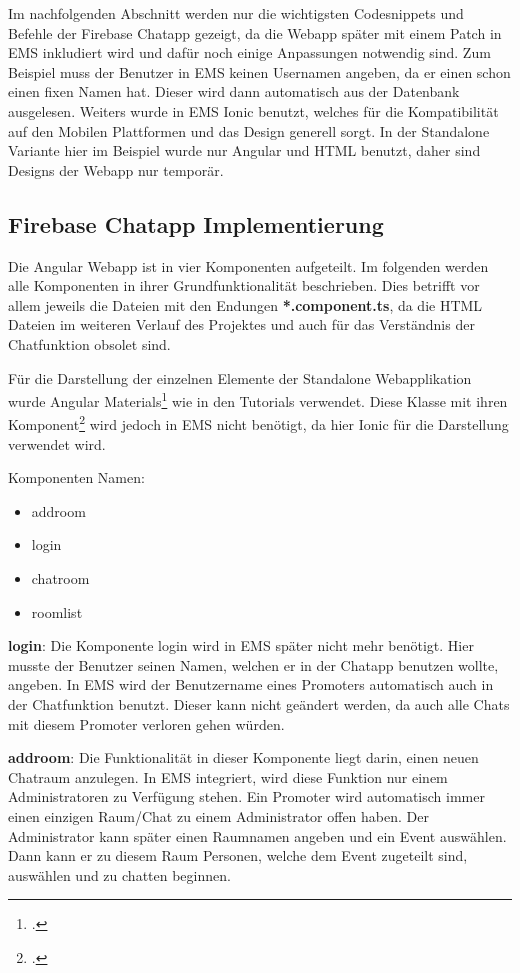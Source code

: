 Im nachfolgenden Abschnitt werden nur die wichtigsten Codesnippets und Befehle der Firebase Chatapp gezeigt, da die Webapp später mit einem Patch in EMS inkludiert wird und dafür noch einige Anpassungen notwendig sind.
Zum Beispiel muss der Benutzer in EMS keinen Usernamen angeben, da er einen schon einen fixen Namen hat. Dieser wird dann automatisch aus der Datenbank ausgelesen. Weiters wurde in EMS Ionic benutzt, welches für die 
Kompatibilität auf den Mobilen Plattformen und das Design generell sorgt. In der Standalone Variante hier im Beispiel wurde nur Angular und HTML benutzt, daher sind Designs der Webapp nur temporär.
\subsection{Firebase Chatapp Implementierung}
Die Angular Webapp ist in vier Komponenten aufgeteilt. Im folgenden werden alle Komponenten in ihrer Grundfunktionalität beschrieben. Dies betrifft vor allem jeweils die Dateien mit den Endungen \textbf{*.component.ts}, da die 
HTML Dateien im weiteren Verlauf des Projektes und auch für das Verständnis der Chatfunktion obsolet sind.

Für die Darstellung der einzelnen Elemente der Standalone Webapplikation wurde Angular Materials\footcite{materials} wie in den Tutorials verwendet.
Diese Klasse mit ihren Komponent\footcite{matierials-componenten} wird jedoch in EMS nicht benötigt, da hier Ionic für die Darstellung verwendet wird.

Komponenten Namen:
\begin{itemize}
	\item addroom
	\item login
	\item chatroom
	\item roomlist
\end{itemize}
\textbf{login}: Die Komponente login wird in EMS später nicht mehr benötigt. Hier musste der Benutzer seinen Namen, welchen er in der Chatapp benutzen wollte, angeben. In EMS wird der Benutzername eines Promoters automatisch
auch in der Chatfunktion benutzt. Dieser kann nicht geändert werden, da auch alle Chats mit diesem Promoter verloren gehen würden.

\textbf{addroom}: Die Funktionalität in dieser Komponente liegt darin, einen neuen Chatraum anzulegen. In EMS integriert, wird diese Funktion nur einem Administratoren zu
Verfügung stehen. Ein Promoter wird automatisch immer einen einzigen Raum/Chat zu einem Administrator offen haben. Der Administrator kann später einen Raumnamen angeben und ein Event auswählen. Dann kann er zu diesem Raum Personen,
welche dem Event zugeteilt sind, auswählen und zu chatten beginnen.

